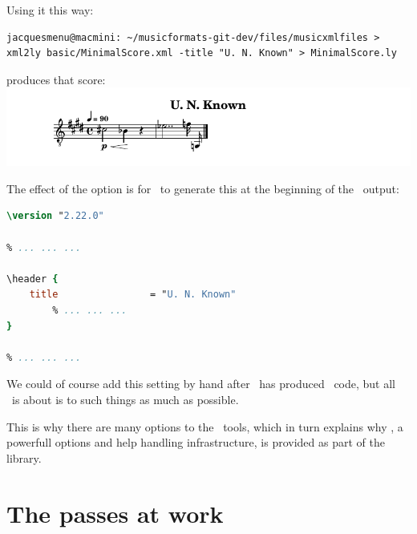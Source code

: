 Using it this way:
\begin{lstlisting}[language=Terminal]
jacquesmenu@macmini: ~/musicformats-git-dev/files/musicxmlfiles > xml2ly basic/MinimalScore.xml -title "U. N. Known" > MinimalScore.ly
\end{lstlisting}

produces that score:\\
\includegraphics[scale=0.7]{../graphics/MinimalScoreWithAnotherTitle.png}

The effect of the  option is for \xmlToLy\ to generate this at the beginning of the \lily\ output:
\begin{lstlisting}[language=Lilypond]
\version "2.22.0"

% ... ... ...

\header {
    title                = "U. N. Known"
		% ... ... ...
}

% ... ... ...
\end{lstlisting}

We could of course add this  setting by hand after \xmlToLy\ has produced \lily\ code, but all \mf\ is about is to  such things as much as possible.

This is why there are  many options to the \mf\ tools, which in turn explains why \oahRepr, a powerfull options and help handling infrastructure, is provided as part of the library.


\section{The passes at work}

